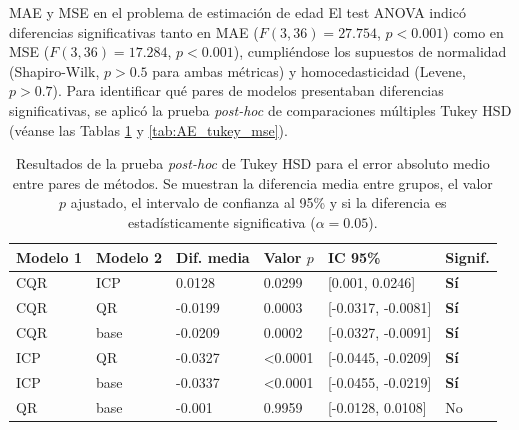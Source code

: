 \begin{StatisticsRef}{MAE y MSE en el problema de estimación de edad}
%
El test ANOVA indicó diferencias significativas tanto en MAE ($F(3, 36) = 27.754$, $p < 0.001$) como en MSE ($F(3, 36) = 17.284$, $p < 0.001$), cumpliéndose los supuestos de normalidad (Shapiro-Wilk, $p > 0.5$ para ambas métricas) y homocedasticidad (Levene, $p>0.7$).
%
Para identificar qué pares de modelos presentaban diferencias significativas, se aplicó la prueba \textit{post-hoc} de comparaciones múltiples Tukey HSD (véanse las Tablas \ref{tab:AE_tukey_mae} y \ref{tab:AE_tukey_mse}).

%
\renewcommand{\arraystretch}{1.2}
\begin{table}[H]
    \small
    \centering
    \begin{tabular}{llllll}
    \toprule
    \textbf{Modelo 1} & \textbf{Modelo 2} & \textbf{Dif. media} & \textbf{Valor $p$} & \textbf{IC 95\%} & \textbf{Signif.} \\ \hline
    CQR & ICP & 0.0128 & 0.0299 & [0.001, 0.0246] & \textbf{Sí} \\
    CQR & QR & -0.0199 & 0.0003 & [-0.0317, -0.0081] & \textbf{Sí} \\
    CQR & base & -0.0209 & 0.0002 & [-0.0327, -0.0091] & \textbf{Sí} \\
    ICP & QR & -0.0327 & \textless 0.0001 & [-0.0445, -0.0209] & \textbf{Sí} \\
    ICP & base & -0.0337 & \textless 0.0001 & [-0.0455, -0.0219] & \textbf{Sí} \\
    QR & base & -0.001 & 0.9959 & [-0.0128, 0.0108] & No \\
    \bottomrule
    \end{tabular}
    \caption[
        Problema de estimación de edad: 
        Resultados de la prueba \textit{post-hoc} de Tukey HSD para el error absoluto medio entre pares de métodos.
    ]{
        Resultados de la prueba \textit{post-hoc} de Tukey HSD para el error absoluto medio entre pares de métodos.
        Se muestran la diferencia media entre grupos, el valor $p$ ajustado, el intervalo de confianza al 95\% y si la diferencia es estadísticamente significativa ($\alpha = 0.05$).
    }
    \label{tab:AE_tukey_mae}
\end{table}


\end{StatisticsRef}
